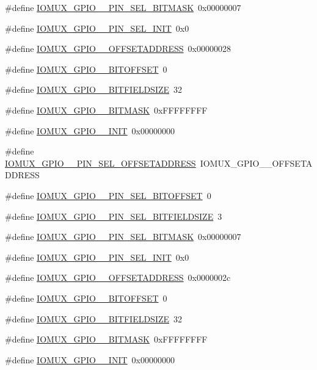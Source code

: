 \begin{DoxyCompactItemize}
\item 
\#define \hyperlink{a00560_ae24c5d250fa96487054fd6d4a81ea4c5}{IOMUX\_\-GPIO\_\_\-PIN\_\-SEL\_\-BITMASK}~0x00000007
\item 
\#define \hyperlink{a00560_ac71cda9a8a64f5d4550c264b36407290}{IOMUX\_\-GPIO\_\_\-PIN\_\-SEL\_\-INIT}~0x0
\item 
\#define \hyperlink{a00560_a04618ed2c668fcab91ac09511f4e6619}{IOMUX\_\-GPIO\_\_\-OFFSETADDRESS}~0x00000028
\item 
\#define \hyperlink{a00560_ad7eac83e423c67a2ca1b74b09f577a29}{IOMUX\_\-GPIO\_\_\-BITOFFSET}~0
\item 
\#define \hyperlink{a00560_a78c7df629f15781f0fd31fd930970a31}{IOMUX\_\-GPIO\_\_\-BITFIELDSIZE}~32
\item 
\#define \hyperlink{a00560_ab6cee9b69feda1ca0b1b557144d25c21}{IOMUX\_\-GPIO\_\_\-BITMASK}~0xFFFFFFFF
\item 
\#define \hyperlink{a00560_a71f86eac23619c74cee70cebb1ebe0f5}{IOMUX\_\-GPIO\_\_\-INIT}~0x00000000
\item 
\#define \hyperlink{a00560_a5095ebc0b9eb4913cc236c6fe149d1d9}{IOMUX\_\-GPIO\_\_\-PIN\_\-SEL\_\-OFFSETADDRESS}~IOMUX\_\-GPIO\_\_\-OFFSETADDRESS
\item 
\#define \hyperlink{a00560_a172fcbdd20b4aea94cda43abc875273c}{IOMUX\_\-GPIO\_\_\-PIN\_\-SEL\_\-BITOFFSET}~0
\item 
\#define \hyperlink{a00560_a9c993a1df37f8e91a49e61edab02c3c7}{IOMUX\_\-GPIO\_\_\-PIN\_\-SEL\_\-BITFIELDSIZE}~3
\item 
\#define \hyperlink{a00560_ad89220ab8b70525f0f5e182fa86c4982}{IOMUX\_\-GPIO\_\_\-PIN\_\-SEL\_\-BITMASK}~0x00000007
\item 
\#define \hyperlink{a00560_a69b607dd89a3573112c2228c5149ae5f}{IOMUX\_\-GPIO\_\_\-PIN\_\-SEL\_\-INIT}~0x0
\item 
\#define \hyperlink{a00560_a37efa01be726c91d478305da94d0ed10}{IOMUX\_\-GPIO\_\_\-OFFSETADDRESS}~0x0000002c
\item 
\#define \hyperlink{a00560_a291f89acee7feb08861dd071be3a97bb}{IOMUX\_\-GPIO\_\_\-BITOFFSET}~0
\item 
\#define \hyperlink{a00560_a50165706039c3fe6c2190d7f4cd79071}{IOMUX\_\-GPIO\_\_\-BITFIELDSIZE}~32
\item 
\#define \hyperlink{a00560_aba2d60d8e67c2df32aafcc4931e478fc}{IOMUX\_\-GPIO\_\_\-BITMASK}~0xFFFFFFFF
\item 
\#define \hyperlink{a00560_a8cc593ce57dc925aed7a166025c72a59}{IOMUX\_\-GPIO\_\_\-INIT}~0x00000000

\end{DoxyCompactItemize}
